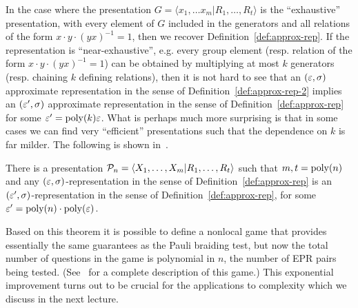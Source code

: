 In the case where the presentation $G = \langle x_1,\ldots x_m | R_1,\ldots, R_t \rangle$ is the ``exhaustive'' presentation, with every element of $G$ included in the generators and all relations of the form $x\cdot y\cdot (yx)^{-1}=1$, then we recover Definition~\ref{def:approx-rep}. If the representation is ``near-exhaustive'', e.g. every group element (resp. relation of the form $x\cdot y\cdot (yx)^{-1}=1$) can be obtained by multiplying at most $k$ generators (resp. chaining $k$ defining relations), then it is not hard to see that an $(\varepsilon,\sigma)$ approximate representation in the sense of Definition~\ref{def:approx-rep-2} implies an $(\varepsilon',\sigma)$ approximate representation in the sense of Definition~\ref{def:approx-rep} for some $\varepsilon' = \operatorname{poly}(k)\varepsilon$. What is perhaps much more surprising is that in some cases we can find very ``efficient'' presentations such that the dependence on $k$ is far milder. The following is shown in~\cite{ji2020quantum}.

\begin{theorem}
There is a presentation $\mathcal{P}_n = \langle X_1,\ldots,X_m | R_1,\ldots,R_t \rangle$ such that $m,t=\operatorname{poly}(n)$ and any $(\varepsilon,\sigma)$-representation in the sense of Definition~\ref{def:approx-rep} is an $(\varepsilon',\sigma)$-representation in the sense of Definition~\ref{def:approx-rep}, for some $\varepsilon' = \operatorname{poly}(n)\cdot \operatorname{poly}(\varepsilon)$. 
\end{theorem}

Based on this theorem it is possible to define a nonlocal game that provides essentially the same guarantees as the Pauli braiding test, but now the total number of questions in the game is polynomial in $n$, the number of EPR pairs being tested. (See~\cite[Section 7]{ji2021mip} for a complete description of this game.) This exponential improvement turns out to be crucial for the applications to complexity which we discuss in the next lecture. 
